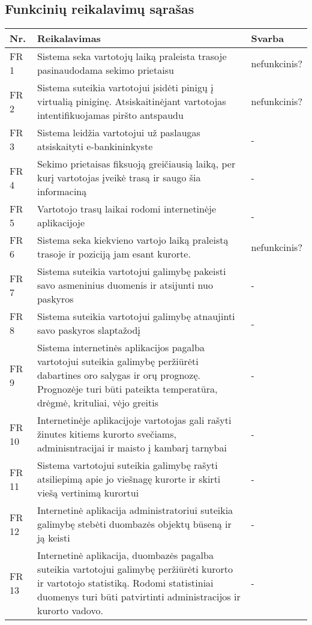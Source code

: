 \documentclass[oneside]{VUMIFPSkursinis}
\begin{document}
\subsection{Funkcinių reikalavimų sąrašas}
\begin{longtable}{ | p{}|p{}|p{}| }  \hline
	Nr. & Reikalavimas &  Svarba   \\ \hline
	FR 1 & Sistema seka vartotojų laiką praleista trasoje pasinaudodama sekimo prietaisu & nefunkcinis? \\ \hline
	FR 2 & Sistema suteikia vartotojui įsidėti pinigų į virtualią piniginę. Atsiskaitinėjant vartotojas intentifikuojamas piršto antspaudu & nefunkcinis? \\ \hline
	FR 3 & Sistema leidžia vartotojui už paslaugas atsiskaityti e-bankininkyste & - \\ \hline
	FR 4 & Sekimo prietaisas fiksuoją greičiausią laiką, per kurį vartotojas įveikė trasą ir saugo šia informaciną & - \\ \hline
	FR 5 & Vartotojo trasų laikai rodomi internetinėje aplikacijoje & - \\ \hline
	FR 6 & Sistema seka kiekvieno vartojo laiką praleistą trasoje ir poziciją jam esant kurorte.   & nefunkcinis? \\ \hline
	FR 7 &  Sistema suteikia vartotojui galimybę pakeisti savo asmeninius duomenis ir atsijunti nuo paskyros& - \\ \hline
	FR 8 & Sistema suteikia vartotojui galimybę atnaujinti savo paskyros slaptažodį & - \\ \hline
	FR 9 & Sistema internetinės aplikacijos pagalba vartotojui suteikia galimybę peržiūrėti dabartines oro salygas ir orų prognozę. Prognozėje turi būti pateikta temperatūra, drėgmė, krituliai, vėjo greitis  & - \\ \hline
	FR 10 & Internetinėje aplikacijoje vartotojas gali rašyti žinutes kitiems kurorto svečiams, adminisntracijai ir maisto į kambarį tarnybai & - \\ \hline
	FR 11 & Sistema vartotojui suteikia galimybę rašyti atsiliepimą apie jo viešnagę kurorte ir skirti viešą vertinimą kurortui & - \\ \hline
	FR 12 & Internetinė aplikacija administratoriui suteikia galimybę stebėti duombazės objektų būseną ir ją keisti & - \\ \hline
	FR 13 & Internetinė aplikacija, duombazės pagalba suteikia vartotojui galimybę peržiūrėti kurorto ir vartotojo statistiką. Rodomi statistiniai duomenys turi būti patvirtinti administracijos ir kurorto vadovo. & - \\ \hline

\end{longtable}
\end{document}
